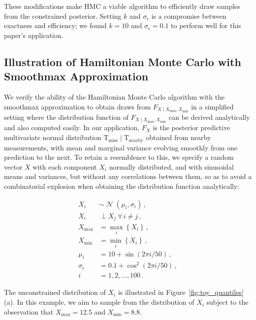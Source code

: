 \documentclass[letter]{article}
\newcommand{\genericdel}[3]{%
      \left#1#3\right#2
    }
\newcommand{\del}[1]{\genericdel(){#1}}
\newcommand{\cbr}[1]{\genericdel\{\}{#1}}
\DeclareMathOperator{\normal}{\mathcal{N}}
\newcommand{\T}{\mathrm{T}}
\newcommand{\indep}{\perp}
\newcommand{\miss}{\mathrm{miss}}
\newcommand{\obs}{\mathrm{nearby}}
\newcommand{\Xmax}{X_{\max}}
\newcommand{\Xmin}{X_{\min}}
\newcommand{\Fcond}{F_{X \mid \Xmax,\Xmin}}
\newcommand{\eqlabel}[1]{\label{#1}}
\begin{document}
These modifications make HMC a viable algorithm to efficiently draw samples from the constrained posterior.
Setting \(k\) and \(\sigma_\epsilon\) is a compromise between exactness and efficiency;
we found \(k=10\) and \(\sigma_\epsilon=0.1\) to perform well for this paper's application.
    


        \subsection{Illustration of Hamiltonian Monte Carlo with Smoothmax Approximation}\label{illustration-of-hamiltonian-monte-carlo-with-smoothmax-approximation}

We verify the ability of the Hamiltonian Monte Carlo algorithm with the smoothmax approximation to obtain draws from \(\Fcond\) in a simplified setting where the distribution function of \(\Fcond\) can be derived analytically and also computed easily.
In our application, \(F_X\) is the posterior predictive multivariate normal distribution \(\T_\miss \mid \T_\obs\) obtained from nearby measurements, with mean and marginal variance evolving smoothly from one prediction to the next.
To retain a resemblence to this, we specify a random vector \(X\) with each component \(X_i\) normally distributed, and with sinusoidal means and variances, but without any correlations between them,
so as to avoid a combinatorial explosion when obtaining the distribution function analytically:

\begin{equation}
\eqlabel{eq:toyspec}
\begin{split}
X_i &\sim \normal \del{\mu_i, \sigma_i} \,, \\
X_i & \indep X_j ~\forall\, i \neq j \,, \\
\Xmax &= \max_i\cbr{X_i} \,, \\
\Xmin &= \min_i\cbr{X_i} \,,\\
\mu_i &= 10 + \sin\del{2\pi i / 50} \,, \\
\sigma_i &= 0.1+\cos^2\del{2\pi i / 50} \,, \\
i &= 1, 2, \ldots, 100 \,.
\end{split}
\end{equation}

The unconstrained distribution of \(X_i\) is illustrated in Figure~\ref{fig:toy_quantiles}(a).
In this example, we aim to sample from the distribution of \(X_i\) subject to the observation that \(\Xmax=12.5\) and \(\Xmin=8.8\).
\end{document}
